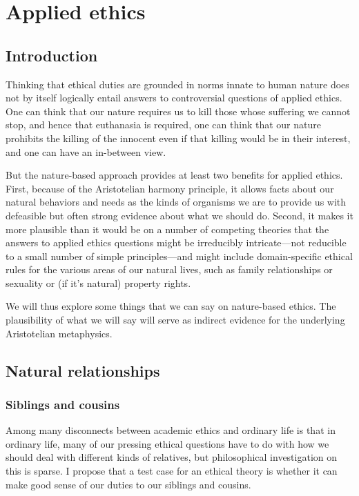\def\mychapter{IV}
\chapter{Applied ethics}\label{ch:applied-ethics}
\section{Introduction}
Thinking that ethical duties are grounded in norms innate to human nature does not by itself logically entail answers to controversial 
questions of applied ethics. One can think that our nature requires us to kill those whose suffering we cannot stop,
and hence that euthanasia is required, one can think that our nature prohibits the killing of the innocent even if that killing
would be in their interest, and one can have an in-between view. 

But the nature-based approach provides at least two benefits for applied ethics. First, because of the Aristotelian harmony principle, it 
allows facts about our natural behaviors and needs as the kinds of organisms we are to provide us with defeasible but often strong
evidence about what we should do. Second, it makes it more plausible than it would be on a number of competing theories that the answers 
to applied ethics questions might be irreducibly intricate---not reducible to a small number of simple principles---and might include 
domain-specific ethical rules for the various areas of our natural lives, such as family relationships or sexuality or (if it's natural)
property rights. 

We will thus explore some things that we can say on nature-based ethics. The plausibility of what we will say will serve as indirect
evidence for the underlying Aristotelian metaphysics.

\section{Natural relationships}
\subsection{Siblings and cousins}
Among many disconnects between academic ethics and ordinary life is that in ordinary life, many of our 
pressing ethical questions have to do with how we should deal with different kinds of relatives, but 
philosophical investigation on this is sparse. I propose that a test case for an ethical theory is whether 
it can make good sense of our duties to our siblings and cousins.
 

